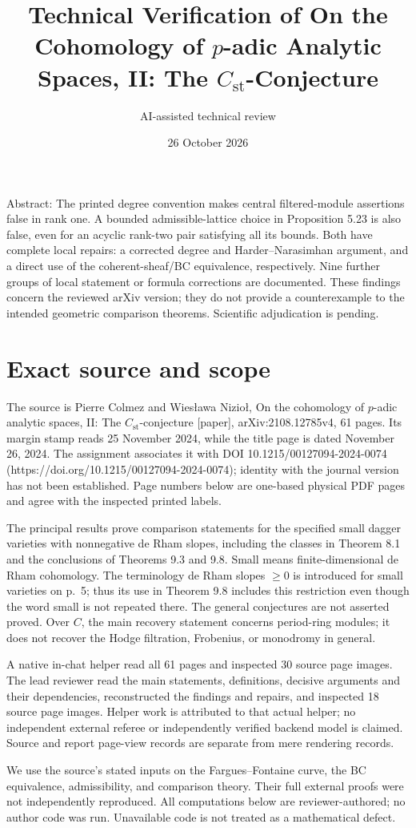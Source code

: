 \documentclass[10pt]{article}
\title{Technical Verification of
On the Cohomology of \(p\)-adic Analytic Spaces, II:
The \(C_{\mathrm{st}}\)-Conjecture}
\author{AI-assisted technical review}
\date{26 October 2026}
\begin{document}
\maketitle
Abstract: The printed degree convention makes central filtered-module assertions false in rank one. A bounded admissible-lattice choice in Proposition 5.23 is also false, even for an acyclic rank-two pair satisfying all its bounds. Both have complete local repairs: a corrected degree and Harder–Narasimhan argument, and a direct use of the coherent-sheaf/BC equivalence, respectively. Nine further groups of local statement or formula corrections are documented. These findings concern the reviewed arXiv version; they do not provide a counterexample to the intended geometric comparison theorems. Scientific adjudication is pending.\par
\section*{Exact source and scope}
The source is Pierre Colmez and Wiesława Nizioł, On the cohomology of \(p\)-adic analytic spaces, II: The \(C_{\mathrm{st}}\)-conjecture [paper], arXiv:2108.12785v4, 61 pages. Its margin stamp reads 25 November 2024, while the title page is dated November 26, 2024. The assignment associates it with DOI 10.1215/00127094-2024-0074 (https://doi.org/10.1215/00127094-2024-0074); identity with the journal version has not been established. Page numbers below are one-based physical PDF pages and agree with the inspected printed labels.\par
The principal results prove comparison statements for the specified small dagger varieties with nonnegative de Rham slopes, including the classes in Theorem 8.1 and the conclusions of Theorems 9.3 and 9.8. Small means finite-dimensional de Rham cohomology. The terminology de Rham slopes \(\geq0\) is introduced for small varieties on p. 5; thus its use in Theorem 9.8 includes this restriction even though the word small is not repeated there. The general conjectures are not asserted proved. Over \(C\), the main recovery statement concerns period-ring modules; it does not recover the Hodge filtration, Frobenius, or monodromy in general.\par
A native in-chat helper read all 61 pages and inspected 30 source page images. The lead reviewer read the main statements, definitions, decisive arguments and their dependencies, reconstructed the findings and repairs, and inspected 18 source page images. Helper work is attributed to that actual helper; no independent external referee or independently verified backend model is claimed. Source and report page-view records are separate from mere rendering records.\par
We use the source’s stated inputs on the Fargues–Fontaine curve, the BC equivalence, admissibility, and comparison theory. Their full external proofs were not independently reproduced. All computations below are reviewer-authored; no author code was run. Unavailable code is not treated as a mathematical defect.\par
\end{document}
